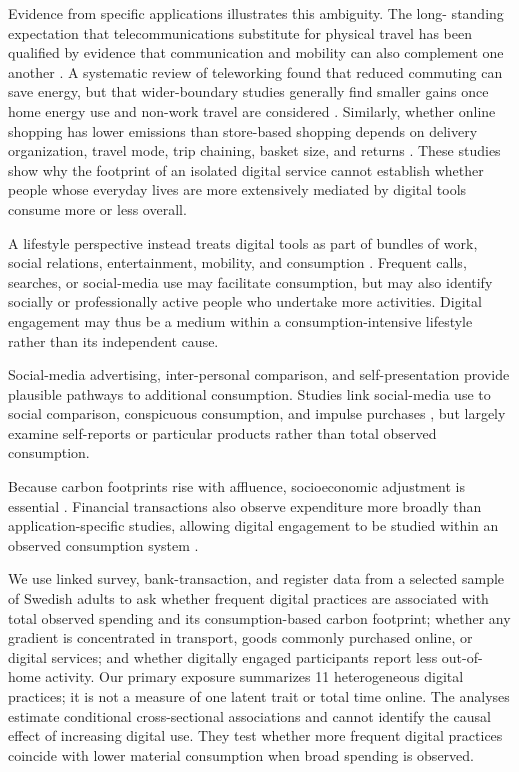 \documentclass[11pt,a4paper]{article}
\begin{document}
Evidence from specific applications illustrates this ambiguity. The long-
standing expectation that telecommunications substitute for physical travel
has been qualified by evidence that communication and mobility can also
complement one another \citep{mokhtarian2002,andreev2010,aguilera2012}. A
systematic review of teleworking found that reduced commuting can save energy,
but that wider-boundary studies generally find smaller gains once home energy
use and non-work travel are considered \citep{hook2020}. Similarly, whether
online shopping has lower emissions than store-based shopping depends on
delivery organization, travel mode, trip chaining, basket size, and returns
\citep{wiese2012,shahmohammadi2020}. These studies show why the footprint of an
isolated digital service cannot establish whether people whose everyday lives
are more extensively mediated by digital tools consume more or less overall.

A lifestyle perspective instead treats digital tools as part of bundles of
work, social relations, entertainment, mobility, and consumption
\citep{ropke2012}. Frequent calls, searches, or social-media use may facilitate
consumption, but may also identify socially or professionally active people who
undertake more activities. Digital engagement may thus be a medium within a
consumption-intensive lifestyle rather than its independent cause.

Social-media advertising, inter-personal comparison, and self-presentation provide plausible
pathways to additional consumption. Studies link social-media use to social
comparison, conspicuous consumption, and impulse purchases
\citep{vogel2014,verduyn2017,taylor2016,djafarova2021}, but largely examine
self-reports or particular products rather than total observed consumption.

Because carbon footprints rise with affluence, socioeconomic
adjustment is essential \citep{ivanova2016,oswald2020,wiedmann2020}.
Financial transactions also observe expenditure more broadly than
application-specific studies, allowing digital engagement to be studied within
an observed consumption system \citep{andersson2023}.

We use linked survey, bank-transaction, and register data from a selected sample
of Swedish adults to ask whether frequent digital practices are associated with
total observed spending and its consumption-based carbon footprint; whether
any gradient is concentrated in transport, goods commonly purchased online, or
digital services; and whether digitally engaged participants report less
out-of-home activity.
Our primary exposure summarizes 11 heterogeneous digital practices; it is not
a measure of one latent trait or total time online. The analyses estimate conditional
cross-sectional associations and cannot identify the causal effect of
increasing digital use. They test whether more frequent digital practices
coincide with lower material consumption when broad spending is observed.
\end{document}
